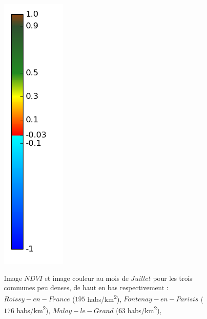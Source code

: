 \documentclass{book}
\begin{document}
\begin{figure}[H]
{\includegraphics[scale=0.3]{images/colormap.png}
}
\caption{Image $NDVI$ et image couleur au mois de $Juillet$ pour les trois communes peu denses, de haut en bas respectivement :
$Roissy-en-France$ ($195$ habs/km\textsuperscript{2}),
$Fontenay-en-Parisis$ ($176$ habs/km\textsuperscript{2}),
$Malay-le-Grand$ ($63$ habs/km\textsuperscript{2}),
}
\label{ndvi_cat3}
\end{figure}
\clearpage
\end{document}
